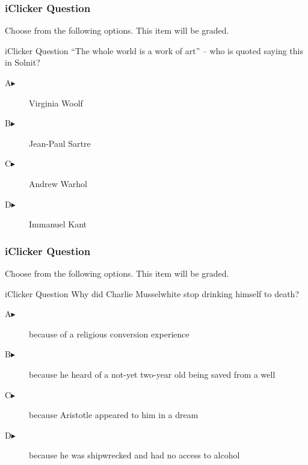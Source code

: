 \documentclass[xcolor=dvipsnames]{beamer}
\begin{document}
\begin{frame}
  \frametitle{iClicker Question}
Choose from the following options. This item will be graded.
\begin{block}{iClicker Question}
``The whole world is a work of art'' -- who is quoted saying this in Solnit?
\end{block}
\begin{description}
\item[A\hspace{.2in}$\blacktriangleright$] Virginia Woolf
\item[B\hspace{.2in}$\blacktriangleright$] Jean-Paul Sartre
\item[C\hspace{.2in}$\blacktriangleright$] Andrew Warhol
\item[D\hspace{.2in}$\blacktriangleright$] Immanuel Kant
\end{description}
\end{frame}

\begin{frame}
  \frametitle{iClicker Question}
Choose from the following options. This item will be graded.
\begin{block}{iClicker Question}
Why did Charlie Musselwhite stop drinking himself to death?
\end{block}
\begin{description}
\item[A\hspace{.2in}$\blacktriangleright$] because of a religious
  conversion experience
\item[B\hspace{.2in}$\blacktriangleright$] because he heard of a
  not-yet two-year old being saved from a well
\item[C\hspace{.2in}$\blacktriangleright$] because Aristotle
  appeared to him in a dream
\item[D\hspace{.2in}$\blacktriangleright$] because he was shipwrecked
  and had no access to alcohol
\end{description}
\end{frame}
\end{document}
